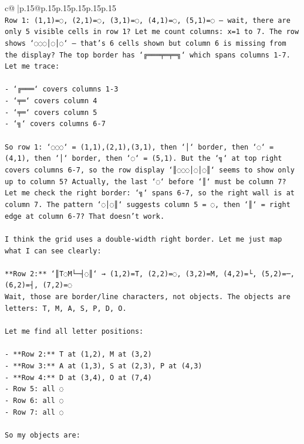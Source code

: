 \documentclass{article}
\begin{document}
{\begin{supertabular}{c@{$\;$}|p{.15\linewidth}@{}p{.15\linewidth}p{.15\linewidth}p{.15\linewidth}p{.15\linewidth}p{.15\linewidth}}
{{{\\ 
\texttt{Row 1: (1,1)=◌, (2,1)=◌, (3,1)=◌, (4,1)=◌, (5,1)=◌ — wait, there are only 5 visible cells in row 1? Let me count columns: x=1 to 7. The row shows `◌◌◌│◌│◌` — that's 6 cells shown but column 6 is missing from the display? The top border has `╔═══╤═╤═╗` which spans columns 1{-}7. Let me trace:} \\
\\ 
\texttt{{-} `╔═══` covers columns 1{-}3} \\
\texttt{{-} `╤═` covers column 4} \\
\texttt{{-} `╤═` covers column 5} \\
\texttt{{-} `╗` covers columns 6{-}7} \\
\\ 
\texttt{So row 1: `◌◌◌` = (1,1),(2,1),(3,1), then `│` border, then `◌` = (4,1), then `│` border, then `◌` = (5,1). But the `╗` at top right covers columns 6{-}7, so the row display `║◌◌◌│◌│◌║` seems to show only up to column 5? Actually, the last `◌` before `║` must be column 7? Let me check the right border: `╗` spans 6{-}7, so the right wall is at column 7. The pattern `◌│◌║` suggests column 5 = ◌, then `║` = right edge at column 6{-}7? That doesn't work.} \\
\\ 
\texttt{I think the grid uses a double{-}width right border. Let me just map what I can see clearly:} \\
\\ 
\texttt{**Row 2:** `║T◌M└─┤◌║` → (1,2)=T, (2,2)=◌, (3,2)=M, (4,2)=└, (5,2)=─, (6,2)=┤, (7,2)=◌} \\
\texttt{Wait, those are border/line characters, not objects. The objects are letters: T, M, A, S, P, D, O.} \\
\\ 
\texttt{Let me find all letter positions:} \\
\\ 
\texttt{{-} **Row 2:** T at (1,2), M at (3,2)} \\
\texttt{{-} **Row 3:** A at (1,3), S at (2,3), P at (4,3)} \\
\texttt{{-} **Row 4:** D at (3,4), O at (7,4)} \\
\texttt{{-} Row 5: all ◌} \\
\texttt{{-} Row 6: all ◌  } \\
\texttt{{-} Row 7: all ◌} \\
\\ 
\texttt{So my objects are:} \\
}}}
\end{supertabular}}
\end{document}
